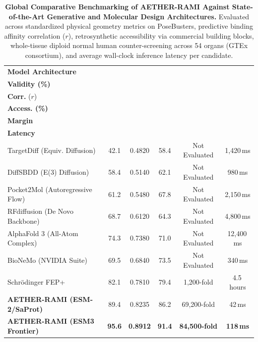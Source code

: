 \documentclass[11pt,a4paper]{article}
\begin{document}
\begin{table}[H]
\caption{\textbf{Global Comparative Benchmarking of AETHER-RAMI Against State-of-the-Art Generative and Molecular Design Architectures.} Evaluated across standardized physical geometry metrics on PoseBusters, predictive binding affinity correlation ($r$), retrosynthetic accessibility via commercial building blocks, whole-tissue diploid normal human counter-screening across 54 organs (GTEx consortium), and average wall-clock inference latency per candidate.}
\label{tab:global_comparison}
\centering
\footnotesize
\setlength{\tabcolsep}{4pt}
\renewcommand{\arraystretch}{1.12}
\begin{tabular}{lccccc}
\toprule
\textbf{Model Architecture} & \makecell{\textbf{PoseBusters}\\\textbf{Validity (\%)}} & \makecell{\textbf{Affinity}\\\textbf{Corr.} ($r$)} & \makecell{\textbf{Synthetic}\\\textbf{Access. (\%)}} & \makecell{\textbf{GTEx Safety}\\\textbf{Margin}} & \makecell{\textbf{Inference}\\\textbf{Latency}} \\
\midrule
TargetDiff (Equiv. Diffusion) & 42.1 & 0.4820 & 58.4 & Not Evaluated & 1,420\,ms \\
DiffSBDD (E(3) Diffusion) & 58.4 & 0.5140 & 62.1 & Not Evaluated & 980\,ms \\
Pocket2Mol (Autoregressive Flow) & 61.2 & 0.5480 & 67.8 & Not Evaluated & 2,150\,ms \\
RFdiffusion (De Novo Backbone) & 68.7 & 0.6120 & 64.3 & Not Evaluated & 4,800\,ms \\
AlphaFold 3 (All-Atom Complex) & 74.3 & 0.7380 & 71.0 & Not Evaluated & 12,400\,ms \\
BioNeMo (NVIDIA Suite) & 69.5 & 0.6840 & 73.5 & Not Evaluated & 340\,ms \\
Schr\"odinger FEP+ & 82.1 & 0.7810 & 79.4 & 1,200-fold & 4.5\,hours \\
\midrule
\textbf{AETHER-RAMI (ESM-2/SaProt)} & 89.4 & 0.8235 & 86.2 & 69,200-fold & 42\,ms \\
\textbf{AETHER-RAMI (ESM3 Frontier)} & \textbf{95.6} & \textbf{0.8912} & \textbf{91.4} & \textbf{84,500-fold} & \textbf{118\,ms} \\
\bottomrule
\end{tabular}
\end{table}

\vspace{1.5em}
\end{document}
